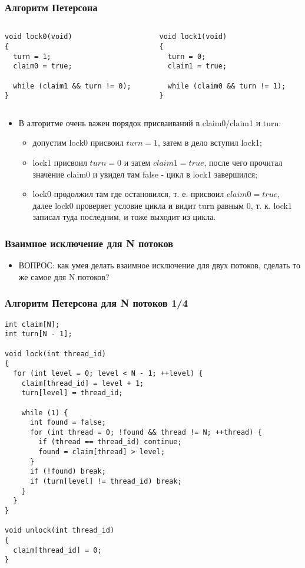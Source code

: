 \begin{frame}[fragile]
\frametitle{Алгоритм Петерсона}
\begin{columns}
  \begin{column}{.45\linewidth}
    \begin{lstlisting}
void lock0(void)
{
  turn = 1;
  claim0 = true;

  while (claim1 && turn != 0);
}
    \end{lstlisting}
  \end{column}
  \begin{column}{.45\linewidth}
    \begin{lstlisting}
void lock1(void)
{
  turn = 0;
  claim1 = true;

  while (claim0 && turn != 1);
}
    \end{lstlisting}
  \end{column}
\end{columns}
\begin{itemize}
  \item В алгоритме очень важен порядок присваиваний в claim0/claim1 и turn:
  \begin{itemize}
    \item допустим lock0 присвоил $turn = 1$, затем в дело вступил lock1;
    \item lock1 присвоил $turn = 0$ и затем $claim1 = true$, после чего
    прочитал значение claim0 и увидел там false - цикл в lock1 завершился;
    \item lock0 продолжил там где остановился, т. е. присвоил $claim0 = true$,
    далее lock0 проверяет условие цикла и видит turn равным 0, т. к. lock1
    записал туда последним, и тоже выходит из цикла.
  \end{itemize}
\end{itemize}
\end{frame}

\begin{frame}
\frametitle{Взаимное исключение для N потоков}
\begin{itemize}
  \item ВОПРОС: как умея делать взаимное исключение для двух потоков, сделать
  то же самое для N потоков?
\end{itemize}
\end{frame}

\begin{frame}[fragile]
\frametitle{Алгоритм Петерсона для N потоков 1/4}
\begin{lstlisting}
int claim[N];
int turn[N - 1];

void lock(int thread_id)
{
  for (int level = 0; level < N - 1; ++level) {
    claim[thread_id] = level + 1;
    turn[level] = thread_id;

    while (1) {
      int found = false;
      for (int thread = 0; !found && thread != N; ++thread) {
        if (thread == thread_id) continue;
        found = claim[thread] > level;
      }
      if (!found) break;
      if (turn[level] != thread_id) break;
    }
  }
}

void unlock(int thread_id)
{
  claim[thread_id] = 0;
}
\end{lstlisting}
\end{frame}

